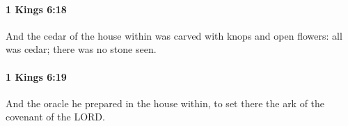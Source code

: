		\paragraph{1 Kings 6:18} %
			\label{1KINGS-6-18}

			And the cedar of the house within was carved with knops and open flowers: all was cedar; there was no stone seen.


		\paragraph{1 Kings 6:19} %
			\label{1KINGS-6-19}

			And the oracle he prepared in the house within, to set there the ark of the covenant of the LORD.


